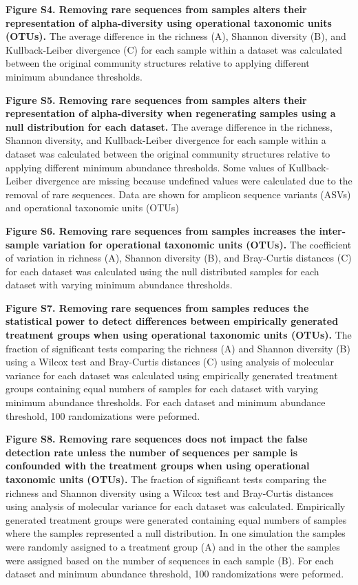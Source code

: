 \documentclass[
]{article}
\begin{document}
\textbf{Figure S4. Removing rare sequences from samples alters their
representation of alpha-diversity using operational taxonomic units
(OTUs).} The average difference in the richness (A), Shannon diversity
(B), and Kullback-Leiber divergence (C) for each sample within a dataset
was calculated between the original community structures relative to
applying different minimum abundance thresholds.

\textbf{Figure S5. Removing rare sequences from samples alters their
representation of alpha-diversity when regenerating samples using a null
distribution for each dataset.} The average difference in the richness,
Shannon diversity, and Kullback-Leiber divergence for each sample within
a dataset was calculated between the original community structures
relative to applying different minimum abundance thresholds. Some values
of Kullback-Leiber divergence are missing because undefined values were
calculated due to the removal of rare sequences. Data are shown for
amplicon sequence variants (ASVs) and operational taxonomic units (OTUs)

\textbf{Figure S6. Removing rare sequences from samples increases the
inter-sample variation for operational taxonomic units (OTUs).} The
coefficient of variation in richness (A), Shannon diversity (B), and
Bray-Curtis distances (C) for each dataset was calculated using the null
distributed samples for each dataset with varying minimum abundance
thresholds.

\textbf{Figure S7. Removing rare sequences from samples reduces the
statistical power to detect differences between empirically generated
treatment groups when using operational taxonomic units (OTUs).} The
fraction of significant tests comparing the richness (A) and Shannon
diversity (B) using a Wilcox test and Bray-Curtis distances (C) using
analysis of molecular variance for each dataset was calculated using
empirically generated treatment groups containing equal numbers of
samples for each dataset with varying minimum abundance thresholds. For
each dataset and minimum abundance threshold, 100 randomizations were
peformed.

\textbf{Figure S8. Removing rare sequences does not impact the false
detection rate unless the number of sequences per sample is confounded
with the treatment groups when using operational taxonomic units
(OTUs).} The fraction of significant tests comparing the richness and
Shannon diversity using a Wilcox test and Bray-Curtis distances using
analysis of molecular variance for each dataset was calculated.
Empirically generated treatment groups were generated containing equal
numbers of samples where the samples represented a null distribution. In
one simulation the samples were randomly assigned to a treatment group
(A) and in the other the samples were assigned based on the number of
sequences in each sample (B). For each dataset and minimum abundance
threshold, 100 randomizations were peformed.
\end{document}

